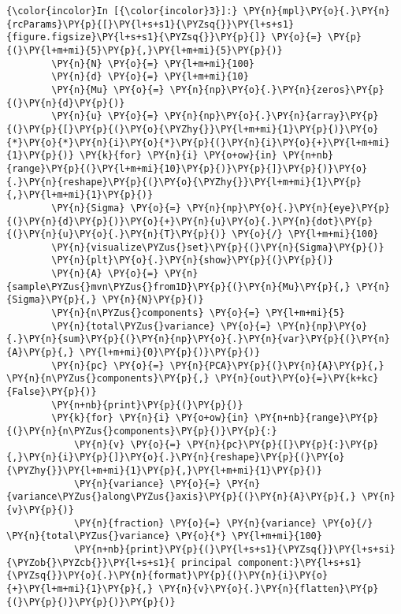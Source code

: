     \begin{Verbatim}[commandchars=\\\{\}]
{\color{incolor}In [{\color{incolor}3}]:} \PY{n}{mpl}\PY{o}{.}\PY{n}{rcParams}\PY{p}{[}\PY{l+s+s1}{\PYZsq{}}\PY{l+s+s1}{figure.figsize}\PY{l+s+s1}{\PYZsq{}}\PY{p}{]} \PY{o}{=} \PY{p}{(}\PY{l+m+mi}{5}\PY{p}{,}\PY{l+m+mi}{5}\PY{p}{)}
        \PY{n}{N} \PY{o}{=} \PY{l+m+mi}{100}
        \PY{n}{d} \PY{o}{=} \PY{l+m+mi}{10}
        \PY{n}{Mu} \PY{o}{=} \PY{n}{np}\PY{o}{.}\PY{n}{zeros}\PY{p}{(}\PY{n}{d}\PY{p}{)}
        \PY{n}{u} \PY{o}{=} \PY{n}{np}\PY{o}{.}\PY{n}{array}\PY{p}{(}\PY{p}{[}\PY{p}{(}\PY{o}{\PYZhy{}}\PY{l+m+mi}{1}\PY{p}{)}\PY{o}{*}\PY{o}{*}\PY{n}{i}\PY{o}{*}\PY{p}{(}\PY{n}{i}\PY{o}{+}\PY{l+m+mi}{1}\PY{p}{)} \PY{k}{for} \PY{n}{i} \PY{o+ow}{in} \PY{n+nb}{range}\PY{p}{(}\PY{l+m+mi}{10}\PY{p}{)}\PY{p}{]}\PY{p}{)}\PY{o}{.}\PY{n}{reshape}\PY{p}{(}\PY{o}{\PYZhy{}}\PY{l+m+mi}{1}\PY{p}{,}\PY{l+m+mi}{1}\PY{p}{)}
        \PY{n}{Sigma} \PY{o}{=} \PY{n}{np}\PY{o}{.}\PY{n}{eye}\PY{p}{(}\PY{n}{d}\PY{p}{)}\PY{o}{+}\PY{n}{u}\PY{o}{.}\PY{n}{dot}\PY{p}{(}\PY{n}{u}\PY{o}{.}\PY{n}{T}\PY{p}{)} \PY{o}{/} \PY{l+m+mi}{100}
        \PY{n}{visualize\PYZus{}set}\PY{p}{(}\PY{n}{Sigma}\PY{p}{)}
        \PY{n}{plt}\PY{o}{.}\PY{n}{show}\PY{p}{(}\PY{p}{)}
        \PY{n}{A} \PY{o}{=} \PY{n}{sample\PYZus{}mvn\PYZus{}from1D}\PY{p}{(}\PY{n}{Mu}\PY{p}{,} \PY{n}{Sigma}\PY{p}{,} \PY{n}{N}\PY{p}{)}
        \PY{n}{n\PYZus{}components} \PY{o}{=} \PY{l+m+mi}{5}
        \PY{n}{total\PYZus{}variance} \PY{o}{=} \PY{n}{np}\PY{o}{.}\PY{n}{sum}\PY{p}{(}\PY{n}{np}\PY{o}{.}\PY{n}{var}\PY{p}{(}\PY{n}{A}\PY{p}{,} \PY{l+m+mi}{0}\PY{p}{)}\PY{p}{)}
        \PY{n}{pc} \PY{o}{=} \PY{n}{PCA}\PY{p}{(}\PY{n}{A}\PY{p}{,} \PY{n}{n\PYZus{}components}\PY{p}{,} \PY{n}{out}\PY{o}{=}\PY{k+kc}{False}\PY{p}{)}
        \PY{n+nb}{print}\PY{p}{(}\PY{p}{)}
        \PY{k}{for} \PY{n}{i} \PY{o+ow}{in} \PY{n+nb}{range}\PY{p}{(}\PY{n}{n\PYZus{}components}\PY{p}{)}\PY{p}{:}
            \PY{n}{v} \PY{o}{=} \PY{n}{pc}\PY{p}{[}\PY{p}{:}\PY{p}{,}\PY{n}{i}\PY{p}{]}\PY{o}{.}\PY{n}{reshape}\PY{p}{(}\PY{o}{\PYZhy{}}\PY{l+m+mi}{1}\PY{p}{,}\PY{l+m+mi}{1}\PY{p}{)}
            \PY{n}{variance} \PY{o}{=} \PY{n}{variance\PYZus{}along\PYZus{}axis}\PY{p}{(}\PY{n}{A}\PY{p}{,} \PY{n}{v}\PY{p}{)}
            \PY{n}{fraction} \PY{o}{=} \PY{n}{variance} \PY{o}{/} \PY{n}{total\PYZus{}variance} \PY{o}{*} \PY{l+m+mi}{100}
            \PY{n+nb}{print}\PY{p}{(}\PY{l+s+s1}{\PYZsq{}}\PY{l+s+si}{\PYZob{}\PYZcb{}}\PY{l+s+s1}{ principal component:}\PY{l+s+s1}{\PYZsq{}}\PY{o}{.}\PY{n}{format}\PY{p}{(}\PY{n}{i}\PY{o}{+}\PY{l+m+mi}{1}\PY{p}{,} \PY{n}{v}\PY{o}{.}\PY{n}{flatten}\PY{p}{(}\PY{p}{)}\PY{p}{)}\PY{p}{)}

\end{Verbatim}
